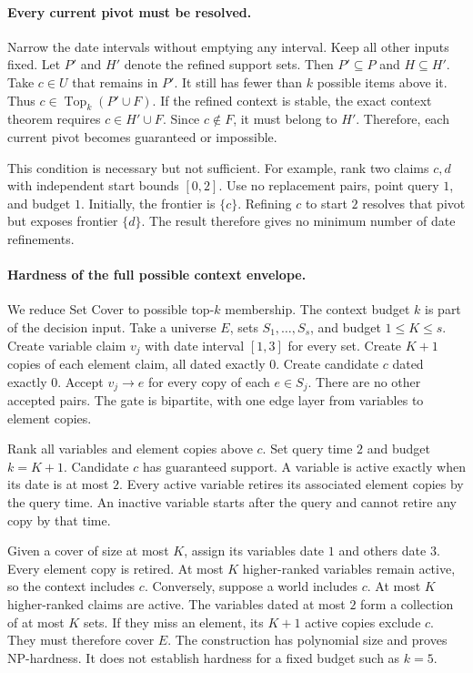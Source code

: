 \paragraph{Every current pivot must be resolved.}
Narrow the date intervals without emptying any interval.
Keep all other inputs fixed.
Let $P'$ and $H'$ denote the refined support sets.
Then $P'\subseteq P$ and $H\subseteq H'$.
Take $c\in U$ that remains in $P'$.
It still has fewer than $k$ possible items above it.
Thus $c\in\operatorname{Top}_k(P'\cup F)$.
If the refined context is stable, the exact context theorem requires $c\in H'\cup F$.
Since $c\notin F$, it must belong to $H'$.
Therefore, each current pivot becomes guaranteed or impossible.

This condition is necessary but not sufficient.
For example, rank two claims $c,d$ with independent start bounds $[0,2]$.
Use no replacement pairs, point query $1$, and budget $1$.
Initially, the frontier is $\{c\}$.
Refining $c$ to start $2$ resolves that pivot but exposes frontier $\{d\}$.
The result therefore gives no minimum number of date refinements.

\paragraph{Hardness of the full possible context envelope.}
We reduce Set Cover to possible top-$k$ membership.
The context budget $k$ is part of the decision input.
Take a universe $E$, sets $S_1,\ldots,S_s$, and budget $1\le K\le s$.
Create variable claim $v_j$ with date interval $[1,3]$ for every set.
Create $K+1$ copies of each element claim, all dated exactly $0$.
Create candidate $c$ dated exactly $0$.
Accept $v_j\to e$ for every copy of each $e\in S_j$.
There are no other accepted pairs.
The gate is bipartite, with one edge layer from variables to element copies.

Rank all variables and element copies above $c$.
Set query time $2$ and budget $k=K+1$.
Candidate $c$ has guaranteed support.
A variable is active exactly when its date is at most $2$.
Every active variable retires its associated element copies by the query time.
An inactive variable starts after the query and cannot retire any copy by that time.

Given a cover of size at most $K$, assign its variables date $1$ and others date $3$.
Every element copy is retired.
At most $K$ higher-ranked variables remain active, so the context includes $c$.
Conversely, suppose a world includes $c$.
At most $K$ higher-ranked claims are active.
The variables dated at most $2$ form a collection of at most $K$ sets.
If they miss an element, its $K+1$ active copies exclude $c$.
They must therefore cover $E$.
The construction has polynomial size and proves NP-hardness.
It does not establish hardness for a fixed budget such as $k=5$.

